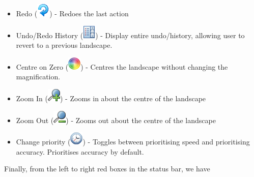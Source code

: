 \documentclass{article}
\begin{document}
\begin{itemize}
					\item Redo (\includegraphics[height=\fontcharht\font`\B]{../src/resources/toolbar/redo}) - Redoes the last action
					
					\item Undo/Redo History (\includegraphics[height=\fontcharht\font`\B]{../src/resources/toolbar/history}) - Display entire undo/history, allowing user to revert to a previous landscape.
					
					\item Centre on Zero (\includegraphics[height=\fontcharht\font`\B]{../src/resources/toolbar/centre}) - Centres the landscape without changing the magnification.
					
					\item Zoom In (\includegraphics[height=\fontcharht\font`\B]{../src/resources/toolbar/zoom_in}) - Zooms in about the centre of the landscape
					
					\item Zoom Out (\includegraphics[height=\fontcharht\font`\B]{../src/resources/toolbar/zoom_out}) - Zooms out about the centre of the landscape
					
					\item Change priority (\includegraphics[height=\fontcharht\font`\B]{../src/resources/toolbar/speed}) - Toggles between prioritising speed and prioritising accuracy. Prioritises accuracy by default.
				\end{itemize}
			
				Finally, from the left to right red boxes in the status bar, we have
				
\end{document}
